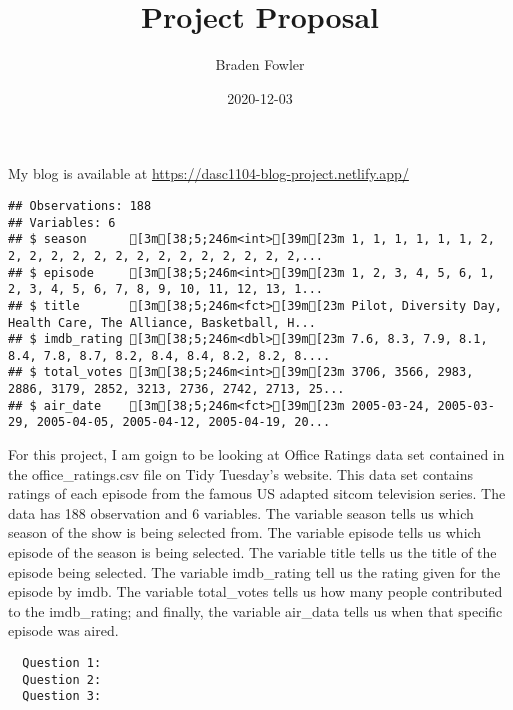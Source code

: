 \documentclass[
]{article}
\title{Project Proposal}
\author{Braden Fowler}
\date{2020-12-03}
\begin{document}
\maketitle

My blog is available at \url{https://dasc1104-blog-project.netlify.app/}

\begin{verbatim}
## Observations: 188
## Variables: 6
## $ season      [3m[38;5;246m<int>[39m[23m 1, 1, 1, 1, 1, 1, 2, 2, 2, 2, 2, 2, 2, 2, 2, 2, 2, 2, 2, 2, 2,...
## $ episode     [3m[38;5;246m<int>[39m[23m 1, 2, 3, 4, 5, 6, 1, 2, 3, 4, 5, 6, 7, 8, 9, 10, 11, 12, 13, 1...
## $ title       [3m[38;5;246m<fct>[39m[23m Pilot, Diversity Day, Health Care, The Alliance, Basketball, H...
## $ imdb_rating [3m[38;5;246m<dbl>[39m[23m 7.6, 8.3, 7.9, 8.1, 8.4, 7.8, 8.7, 8.2, 8.4, 8.4, 8.2, 8.2, 8....
## $ total_votes [3m[38;5;246m<int>[39m[23m 3706, 3566, 2983, 2886, 3179, 2852, 3213, 2736, 2742, 2713, 25...
## $ air_date    [3m[38;5;246m<fct>[39m[23m 2005-03-24, 2005-03-29, 2005-04-05, 2005-04-12, 2005-04-19, 20...
\end{verbatim}

For this project, I am goign to be looking at Office Ratings data set
contained in the office\_ratings.csv file on Tidy Tuesday's website.
This data set contains ratings of each episode from the famous US
adapted sitcom television series. The data has 188 observation and 6
variables. The variable season tells us which season of the show is
being selected from. The variable episode tells us which episode of the
season is being selected. The variable title tells us the title of the
episode being selected. The variable imdb\_rating tell us the rating
given for the episode by imdb. The variable total\_votes tells us how
many people contributed to the imdb\_rating; and finally, the variable
air\_data tells us when that specific episode was aired.

\begin{verbatim}
  Question 1:
  Question 2:
  Question 3:
  
\end{verbatim}
\end{document}
